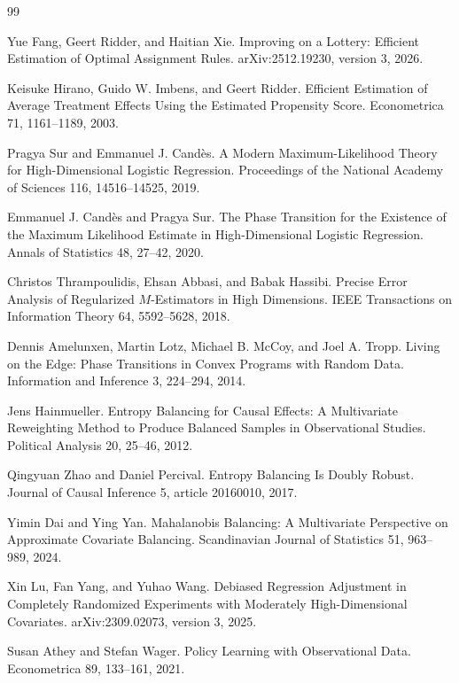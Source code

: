 \documentclass{article}
\begin{document}
\begin{thebibliography}{99}

   Yue Fang, Geert Ridder, and Haitian Xie. Improving on a Lottery: Efficient Estimation of Optimal Assignment Rules. arXiv:2512.19230, version 3, 2026.

   Keisuke Hirano, Guido W. Imbens, and Geert Ridder. Efficient Estimation of Average Treatment Effects Using the Estimated Propensity Score. Econometrica 71, 1161--1189, 2003.

   Pragya Sur and Emmanuel J. Candès. A Modern Maximum-Likelihood Theory for High-Dimensional Logistic Regression. Proceedings of the National Academy of Sciences 116, 14516--14525, 2019.

   Emmanuel J. Candès and Pragya Sur. The Phase Transition for the Existence of the Maximum Likelihood Estimate in High-Dimensional Logistic Regression. Annals of Statistics 48, 27--42, 2020.

   Christos Thrampoulidis, Ehsan Abbasi, and Babak Hassibi. Precise Error Analysis of Regularized \(M\)-Estimators in High Dimensions. IEEE Transactions on Information Theory 64, 5592--5628, 2018.

   Dennis Amelunxen, Martin Lotz, Michael B. McCoy, and Joel A. Tropp. Living on the Edge: Phase Transitions in Convex Programs with Random Data. Information and Inference 3, 224--294, 2014.

   Jens Hainmueller. Entropy Balancing for Causal Effects: A Multivariate Reweighting Method to Produce Balanced Samples in Observational Studies. Political Analysis 20, 25--46, 2012.

   Qingyuan Zhao and Daniel Percival. Entropy Balancing Is Doubly Robust. Journal of Causal Inference 5, article 20160010, 2017.

   Yimin Dai and Ying Yan. Mahalanobis Balancing: A Multivariate Perspective on Approximate Covariate Balancing. Scandinavian Journal of Statistics 51, 963--989, 2024.

   Xin Lu, Fan Yang, and Yuhao Wang. Debiased Regression Adjustment in Completely Randomized Experiments with Moderately High-Dimensional Covariates. arXiv:2309.02073, version 3, 2025.

   Susan Athey and Stefan Wager. Policy Learning with Observational Data. Econometrica 89, 133--161, 2021.


\end{thebibliography}
\end{document}
